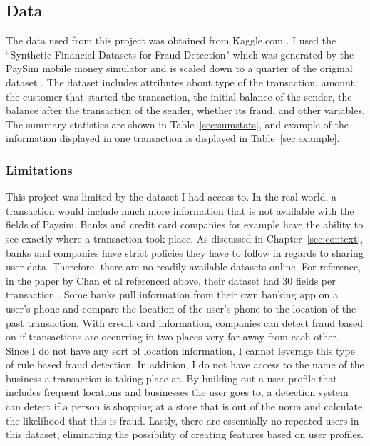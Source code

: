 \documentclass[midd]{thesis}
\begin{document}
\subsection{Data}


The data used from this project was obtained from Kaggle.com \cite{paysim}. I used the ``Synthetic Financial Datasets for Fraud Detection" which was generated by the PaySim mobile money simulator and is scaled down to a quarter of the original dataset \cite{paysim}. The dataset includes attributes about type of the transaction, amount, the customer that started the transaction, the initial balance of the sender, the balance after the transaction of the sender, whether its fraud, and other variables. The summary statistics are shown in Table~\ref{sec:sumstats}, and example of the information displayed in one transaction is displayed in Table~\ref{sec:example}.

\subsubsection{Limitations}

This project was limited by the dataset I had access to. In the real world, a transaction would include much more information that is not available with the fields of Paysim. Banks and credit card companies for example have the ability to see exactly where a transaction took place. As discussed in Chapter~\ref{sec:context}, banks and companies have strict policies they have to follow in regards to sharing user data. Therefore, there are no readily available datasets online. For reference, in the paper by Chan et al referenced above, their dataset had 30 fields per transaction \cite{Chan}. Some banks pull information from their own banking app on a user's phone and compare the location of the user's phone to the location of the past transaction. With credit card information, companies can detect fraud based on if transactions are occurring in two places very far away from each other. Since I do not have any sort of location information, I cannot leverage this type of rule based fraud detection. In addition, I do not have access to the name of the business a transaction is taking place at. By building out a user profile that includes frequent locations and businesses the user goes to, a detection system can detect if a person is shopping at a store that is out of the norm and calculate the likelihood that this is fraud. Lastly, there are essentially no repeated users in this dataset, eliminating the possibility of creating features based on user profiles.
\end{document}
